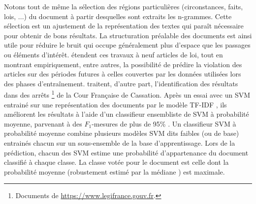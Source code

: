 Notons tout de même la sélection des régions particulières (circonstances, faits, lois, ...) du document à partir desquelles sont extraits les n-grammes. Cette sélection est un ajustement de la représentation des textes qui paraît nécessaire pour obtenir de bons résultats. La structuration préalable des documents est ainsi utile pour réduire le bruit qui occupe généralement plus d'espace que les passages ou éléments d'intérêt.  \citet{medvedeva2018echrCristalBall} étendent ces travaux à neuf articles de loi, tout en montrant empiriquement, entre autres, la possibilité de prédire la violation des articles sur des périodes futures à celles couvertes par les données utilisées lors des phases d'entraînement. \cite{sulea2017legalEnsSVM} traitent, d'autre part, l'identification des résultats dans des arrêts \footnote{Documents de \url{https://www.legifrance.gouv.fr}.} de la Cour Française de Cassation. Après un essai \citep{Sulea2017predictareadecision} avec un SVM entrainé sur une représentation des documents par le modèle  TF-IDF \citep{salton1988term-weighting}, ils améliorent les résultats à l'aide d'un classifieur ensembliste de SVM à probabilité moyenne,
 parvenant à des $F_1$-mesures de plus de 95\% \cite{sulea2017legalEnsSVM}. Un classifieur SVM à probabilité moyenne combine plusieurs modèles SVM dits \og faibles \fg{} (ou de base)  entrainés chacun sur un sous-ensemble de la base d'apprentissage.
Lors de la prédiction, chacun des SVM estime une probabilité d'appartenance du document classifié à chaque classe. La classe votée pour le document est celle dont la  probabilité moyenne (robustement estimé par la médiane \citep{kittler1998combiningClassifiers}) est maximale.

